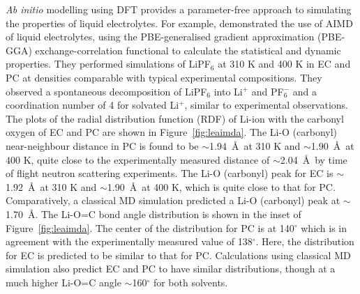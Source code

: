 \documentclass[../main.tex]{subfiles}
\begin{document}
\textit{Ab initio} modelling using DFT provides a parameter-free approach to simulating the properties of liquid electrolytes. For example, \citeauthor{Ganesh2011} demonstrated the use of AIMD of liquid electrolytes, using the PBE-generalised gradient approximation (PBE-GGA) exchange-correlation functional to calculate the statistical and dynamic properties.\cite{Ganesh2011} They performed simulations of LiPF$_6$ at 310 K and 400 K in EC and PC at densities comparable with typical experimental compositions. They observed a spontaneous decomposition of LiPF$_6$ into Li$^+$ and PF$_6^-$ and a coordination number of 4 for solvated Li$^+$, similar to experimental observations. The plots of the radial distribution function (RDF) of Li-ion with the carbonyl oxygen of EC and PC are shown in Figure~\ref{fig:leaimda}. The Li-O (carbonyl) near-neighbour distance in PC is found to be $\sim$1.94~\AA \ at 310 K and $\sim$1.90~\AA \ at 400 K, quite close to the experimentally measured distance of $\sim$2.04~\AA \ by time of flight neutron scattering experiments.\cite{Kameda2007} The  Li-O (carbonyl) peak for EC is $\sim$1.92~\AA \ at 310 K and $\sim$1.90~\AA \ at 400 K, which is quite close to that for PC. Comparatively, a classical MD simulation predicted a Li-O (carbonyl) peak at  $\sim$1.70~\AA.\cite{soetens_molecular_1998} The Li-O=C bond angle distribution is shown in the inset of Figure~\ref{fig:leaimda}. The center of the distribution for PC is at 140$^\circ$ which is in agreement with the experimentally measured value of 138$^\circ$.\cite{Kameda2007} Here, the distribution for EC is predicted to be similar to that for PC. Calculations using classical MD simulation also predict EC and PC to have similar distributions, though at a much higher Li-O=C angle $\sim$160$^\circ$ for both solvents.\cite{soetens_molecular_1998}
\end{document}
